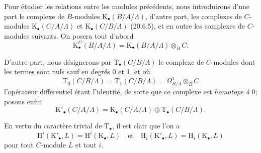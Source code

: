 \begin{env}[20.6.15]
\label{0.20.6.15-fr}
Pour étudier les relations entre les modules précédents, nous introduirons
d'une part le complexe de $B$-modules
$\mathrm{K}_\bullet(B/A/\Lambda)$, d'autre part, les complexes
de $C$-modules $\mathrm{K}_\bullet(C/A/\Lambda)$ et
$\mathrm{K}_\bullet(C/B/\Lambda)$ (20.6.5), et en outre les complexes de
$C$-modules suivants. On posera tout d'abord
\begin{equation}
\tag{20.6.15.1}
\label{0.20.6.15.1-fr}
  \mathrm{K}^C_\bullet(B/A/\Lambda)=
  \mathrm{K}_\bullet(B/A/\Lambda)\otimes_B C.
\end{equation}

D'autre part, nous désignerons par $\mathrm{T}_\bullet(C/B/\Lambda)$ le
complexe de $C$-modules dont les termes sont nuls sauf en degrés 0 et 1,
et où
\begin{equation}
\tag{20.6.15.2}
\label{0.20.6.15.2-fr}
  \mathrm{T}_0(C/B/\Lambda)=\mathrm{T}_1(C/B/\Lambda)=
  \Omega^1_{B/\Lambda}\otimes_B C
\end{equation}
l'opérateur différentiel étant l'identité, de sorte que ce complexe est
\emph{homotope à} 0; posons enfin
\begin{equation}
\tag{20.6.15.3}
\label{0.20.6.15.3-fr}
  \mathrm{K}'_\bullet(C/A/\Lambda)=
  \mathrm{K}_\bullet(C/A/\Lambda)\oplus
  \mathrm{T}_\bullet(C/B/\Lambda).
\end{equation}

En vertu du caractère trivial de $\mathrm{T}_\bullet$, il est clair que
l'on a
\begin{equation}
\tag{20.6.15.4}
\label{0.20.6.15.4-fr}
  \mathrm{H}^i(\mathrm{K}'_\bullet,L)=
  \mathrm{H}^i(\mathrm{K}_\bullet,L)
  \quad\text{et}\quad
  \mathrm{H}_i(\mathrm{K}'_\bullet,L)=
  \mathrm{H}_i(\mathrm{K}_\bullet,L)
\end{equation}
pour tout $C$-module $L$ et tout $i$.
\end{env}
